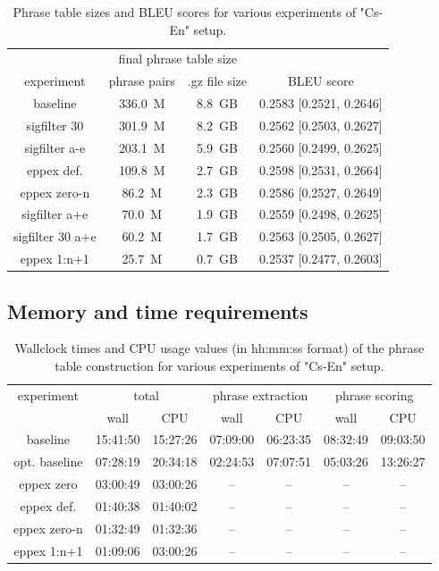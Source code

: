 \begin{table}[ht]
\centering
\begin{tabular}{ | c | c c | c | }
\hline
 & \multicolumn{2}{|c|}{final phrase table size} & \\
experiment & phrase pairs & .gz file size & BLEU score \\
\hline
\hline
baseline          & 336.0~M & 8.8~GB & 0.2583 [0.2521, 0.2646] \\
sigfilter 30      & 301.9~M & 8.2~GB & 0.2562 [0.2503, 0.2627] \\
sigfilter a-e     & 203.1~M & 5.9~GB & 0.2560 [0.2499, 0.2625] \\
eppex def.        & 109.8~M & 2.7~GB & 0.2598 [0.2531, 0.2664] \\
eppex zero-n      &  86.2~M & 2.3~GB & 0.2586 [0.2527, 0.2649] \\
sigfilter a+e     &  70.0~M & 1.9~GB & 0.2559 [0.2498, 0.2625] \\
sigfilter 30 a+e  &  60.2~M & 1.7~GB & 0.2563 [0.2505, 0.2627] \\
eppex 1:n+1       &  25.7~M & 0.7~GB & 0.2537 [0.2477, 0.2603] \\
\hline
\end{tabular}
\caption{\label{cs-en-wmt13-pt-size-and-bleu}
Phrase table sizes and BLEU scores for various experiments of "Cs-En" setup.}
\end{table}

\subsection{Memory and time requirements}

\begin{table}[ht]
\centering
\begin{tabular}{ | c | c c | c c | c c | }
\hline
experiment & \multicolumn{2}{|c|}{total} & \multicolumn{2}{|c|}{phrase extraction} & \multicolumn{2}{|c|}{phrase scoring} \\
 & wall & CPU & wall & CPU & wall & CPU \\
\hline
\hline
baseline      & 15:41:50 & 15:27:26 & 07:09:00 & 06:23:35 & 08:32:49 & 09:03:50 \\
opt. baseline & 07:28:19 & 20:34:18 & 02:24:53 & 07:07:51 & 05:03:26 & 13:26:27 \\
eppex zero    & 03:00:49 & 03:00:26 & -- & -- & -- & -- \\
\hline
eppex def.    & 01:40:38 & 01:40:02 & -- & -- & -- & -- \\
eppex zero-n  & 01:32:49 & 01:32:36 & -- & -- & -- & -- \\
eppex 1:n+1   & 01:09:06 & 03:00:26 & -- & -- & -- & -- \\
\hline
\end{tabular}
\caption{\label{cs-en-wmt13-time-benchmarks}
Wallclock times and CPU usage values (in hh:mm:ss format) of the phrase table
construction for various experiments of "Cs-En" setup.}
\end{table}


